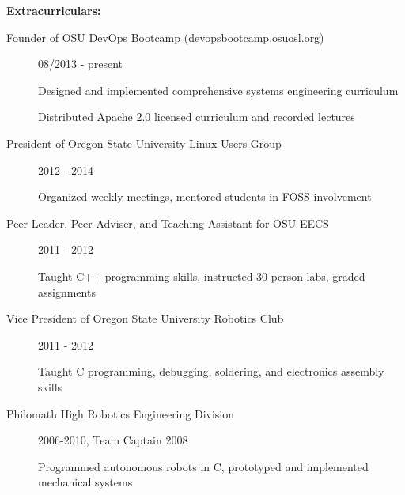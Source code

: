 \documentclass[11pt]{article}
\begin{document}
\smallskip
\hrulefill
\bigskip

{\Large \bf Extracurriculars:}
\begin{description}
    \item[Founder of OSU DevOps Bootcamp (devopsbootcamp.osuosl.org)]
        \hfill 08/2013 - present
        
        Designed and implemented comprehensive systems engineering curriculum

        Distributed Apache 2.0 licensed curriculum and recorded lectures

    \item[President of Oregon State University Linux Users Group]
        \hfill 2012 - 2014

        Organized weekly meetings, mentored students in FOSS involvement

    \item[Peer Leader, Peer Adviser, and Teaching Assistant for OSU EECS]
        \hfill 2011 - 2012

        Taught C++ programming skills, instructed 30-person labs, graded
        assignments

    \item[Vice President of Oregon State University Robotics Club]
        \hfill 2011 - 2012

        Taught C programming, debugging, soldering, and electronics assembly skills

    \item[Philomath High Robotics Engineering Division]
        \hfill 2006-2010, Team Captain 2008

        Programmed autonomous robots in C, prototyped and implemented
        mechanical systems

\end{description}
\end{document}
